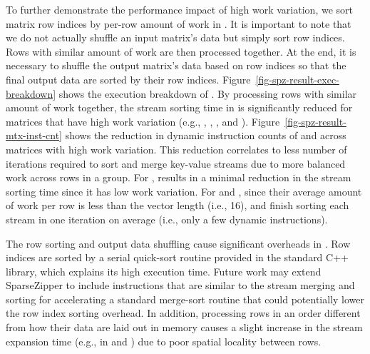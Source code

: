 To further demonstrate the performance impact of high work variation, we
sort matrix row indices by per-row amount of work in .
It is important to note that we do not actually shuffle an input matrix's data
but simply sort row indices.
Rows with similar amount of work are then processed together.
At the end, it is necessary to shuffle the output matrix's data based on row
indices so that the final output data are sorted by their row indices.
Figure~\ref{fig-spz-result-exec-breakdown} shows the execution breakdown of
.
By processing rows with similar amount of work together, the stream sorting
time in  is significantly reduced for matrices that have
high work variation (e.g., , , , and ).
Figure~\ref{fig-spz-result-mtx-inst-cnt} shows the reduction in dynamic
instruction counts of  and  across matrices with high
work variation.
This reduction correlates to less number of iterations required to sort and
merge key-value streams due to more balanced work across rows in a group.
For ,  results in a minimal reduction in the
stream sorting time since it has low work variation.
For  and , since their average amount of work per row
is less than the vector length (i.e., 16),  and
 finish sorting each stream in one iteration on average
(i.e., only a few dynamic  instructions).

The row sorting and output data shuffling cause significant overheads in
.
Row indices are sorted by a serial quick-sort routine provided in the standard
C++ library, which explains its high execution time.
Future work may extend SparseZipper to include instructions that are similar
to the stream merging and sorting for accelerating a standard merge-sort
routine that could potentially lower the row index sorting overhead.
In addition, processing rows in an order different from how their data are laid
out in memory causes a slight increase in the stream expansion time (e.g., in
 and ) due to poor spatial locality between rows.



